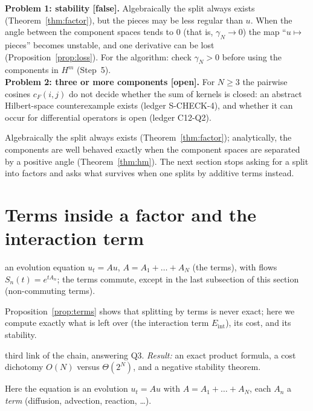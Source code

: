 \documentclass[11pt,a4paper]{article}
\theoremstyle{definition}
\newcommand{\badge}[2]{\textcolor{#1}{\textsf{\footnotesize[#2]}}}
\newcommand{\openq}{\badge{cB}{open}}
\newcommand{\falsest}{\badge{cB}{false}}
\newcommand{\led}[1]{\textcolor{cG}{\textsf{\footnotesize(ledger #1)}}}
\newcommand{\sectionbrief}[3]{\begin{leadin}\begin{description}[nosep,leftmargin=3.0cm,labelwidth=2.8cm]
  \item[Starting from] #1
  \item[Why this section] #2
  \item[Role in the paper] #3
  \end{description}\end{leadin}}
\newcommand{\Eint}{E_{\mathrm{int}}}
\begin{document}
\begin{caution}[title=Two problems with regularity]
\textbf{Problem 1: stability \falsest.} Algebraically the split always exists (Theorem~\ref{thm:factor}), but the pieces may be less regular than $u$. When the angle between the component spaces tends to $0$ (that is, $\gamma_N\to0$) the map ``$u\mapsto$ pieces'' becomes unstable, and one derivative can be lost (Proposition~\ref{prop:loss}). For the algorithm: check $\gamma_N>0$ before using the components in $H^m$ (Step~5).\\[3pt]
\textbf{Problem 2: three or more components \openq.} For $N\ge3$ the pairwise cosines $c_F(i,j)$ do not decide whether the sum of kernels is closed: an abstract Hilbert-space counterexample exists \led{S-CHECK-4}, and whether it can occur for differential operators is open \led{C12-Q2}.
\end{caution}

\begin{takeaway}
Algebraically the split always exists (Theorem~\ref{thm:factor}); analytically, the components are well behaved exactly when the component spaces are separated by a positive angle (Theorem~\ref{thm:hm}). The next section stops asking for a split into factors and asks what survives when one splits by additive terms instead.
\end{takeaway}

\section{Terms inside a factor and the interaction term}\label{sec:terms}
\sectionbrief
{an evolution equation $u_t=Au$, $A=A_1+\dots+A_N$ (the terms), with flows $S_n(t)=e^{tA_n}$; the terms commute, except in the last subsection of this section (non-commuting terms).}
{Proposition~\ref{prop:terms} shows that splitting by terms is never exact; here we compute exactly what is left over (the interaction term $\Eint$), its cost, and its stability.}
{third link of the chain, answering Q3. \emph{Result:} an exact product formula, a cost dichotomy $O(N)$ versus $\Theta(2^N)$, and a negative stability theorem.}

Here the equation is an evolution $u_t=Au$ with $A=A_1+\dots+A_N$, each $A_n$ a \emph{term} (diffusion, advection, reaction, \dots).
\end{document}
